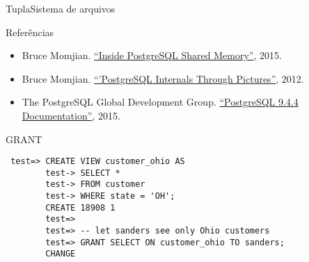 \documentclass{beamer}
\begin{document}
\begin{frame}{Tupla}{Sistema de arquivos}
  
  
\end{frame}

\begin{frame}{Referências}
  
  \begin{itemize}
  \item Bruce Momjian.
    \href{https://momjian.us/main/writings/pgsql/inside_shmem.pdf}{``Inside PostgreSQL Shared Memory''}, 2015.
  \item Bruce Momjian. \href{http://momjian.us/main/writings/pgsql/internalpics.pdf}{``'PostgreSQL Internals Through Pictures''}, 2012.
  \item The PostgreSQL Global Development
    Group. \href{http://www.postgresql.org/docs/9.4/interactive/index.html}{``PostgreSQL 9.4.4 Documentation''}, 2015.
  \end{itemize}
\end{frame}

\begin{frame}[fragile]{GRANT}

  \begin{lstlisting}
 test=> CREATE VIEW customer_ohio AS                 
        test-> SELECT * 
        test-> FROM customer 
        test-> WHERE state = 'OH'; 
        CREATE 18908 1 
        test=> 
        test=> -- let sanders see only Ohio customers 
        test=> GRANT SELECT ON customer_ohio TO sanders; 
        CHANGE
      \end{lstlisting}
    \end{frame}

    
\end{document}
